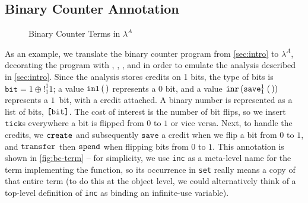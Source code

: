 \subsection{Binary Counter Annotation}

\begin{figure}
  
  \vspace{-0.15in}
  \caption{Binary Counter Terms in $\lambda^A$}
  \label{fig:bc-term}
\end{figure}

As an example, we translate the binary counter program from
\autoref{sec:intro} to $\lambda^A$, decorating the program with
\createname, \spendname, \savename, and \xfername\/ in order to emulate the
analysis described in \autoref{sec:intro}.  Since the analysis
stores credits on 1 bits, the type of bits is $\texttt{bit} = 1 \oplus
!^1_1 1$; a value $\texttt{inl} \, (\,)$ represents a $0$ bit, and a value $\texttt{inr} \, (\texttt{save}^{1}_{1} \; (\, ))$ represents a $1$~bit, with a credit attached. A
binary number is represented as a list of bits, $\texttt{[}\texttt{bit}\texttt{]}$.
The cost of interest is the number of bit flips, so 
we insert $\texttt{tick}$s everywhere a bit is flipped from
$0$ to $1$ or vice versa. Next, to handle the credits, we
$\texttt{create}$ and subsequently $\texttt{save}$ a credit when we
flip a bit from $0$ to $1$, and $\texttt{transfer}$ then $\texttt{spend}$
when flipping bits from $0$ to $1$.
This annotation is shown in \autoref{fig:bc-term} -- for simplicity, we use \texttt{inc} as a meta-level name for the term
implementing the function, so its occurrence in \texttt{set} really means
a copy of that entire term (to do this at the object level, we could
alternatively think of a top-level definition of \texttt{inc} as binding
an infinite-use variable).


